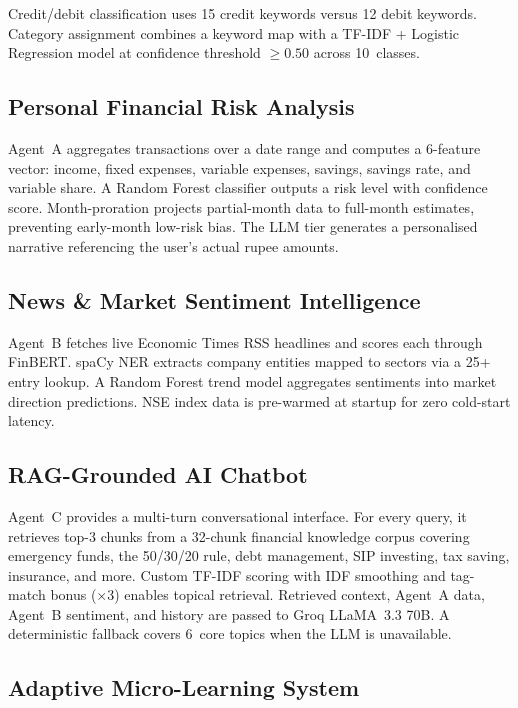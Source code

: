 \documentclass[conference]{IEEEtran}
\begin{document}
Credit/debit classification uses 15 credit keywords versus 12 debit keywords. Category assignment combines a keyword map with a TF-IDF + Logistic Regression model at confidence threshold $\geq 0.50$ across 10~classes.

\subsection{Personal Financial Risk Analysis}

Agent~A aggregates transactions over a date range and computes a 6-feature vector: income, fixed expenses, variable expenses, savings, savings rate, and variable share. A Random Forest classifier outputs a risk level with confidence score. Month-proration projects partial-month data to full-month estimates, preventing early-month low-risk bias. The LLM tier generates a personalised narrative referencing the user's actual rupee amounts.

\subsection{News \& Market Sentiment Intelligence}

Agent~B fetches live Economic Times RSS headlines and scores each through FinBERT. spaCy NER extracts company entities mapped to sectors via a 25+ entry lookup. A Random Forest trend model aggregates sentiments into market direction predictions. NSE index data is pre-warmed at startup for zero cold-start latency.

\subsection{RAG-Grounded AI Chatbot}

Agent~C provides a multi-turn conversational interface. For every query, it retrieves top-3 chunks from a 32-chunk financial knowledge corpus covering emergency funds, the 50/30/20 rule, debt management, SIP investing, tax saving, insurance, and more. Custom TF-IDF scoring with IDF smoothing and tag-match bonus ($\times 3$) enables topical retrieval. Retrieved context, Agent~A data, Agent~B sentiment, and history are passed to Groq LLaMA~3.3 70B. A deterministic fallback covers 6~core topics when the LLM is unavailable.

\subsection{Adaptive Micro-Learning System}
\end{document}
